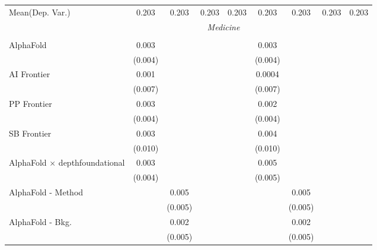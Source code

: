 \begin{tabular}{lcccccccc}
Mean(Dep. Var.) & 0.203 & 0.203 & 0.203 & 0.203 & 0.203 & 0.203 & 0.203 & 0.203 \\
 & \multicolumn{6}{c}{\textit{Medicine}} \\ \\
   AlphaFold                                      & 0.003   &               &       &       & 0.003   &               &       &   \\   
                                                  & (0.004) &               &       &       & (0.004) &               &       &   \\   
   AI Frontier                                    & 0.001   &               &       &       & 0.0004  &               &       &   \\   
                                                  & (0.007) &               &       &       & (0.007) &               &       &   \\   
   PP Frontier                                    & 0.003   &               &       &       & 0.002   &               &       &   \\   
                                                  & (0.004) &               &       &       & (0.004) &               &       &   \\   
   SB Frontier                                    & 0.003   &               &       &       & 0.004   &               &       &   \\   
                                                  & (0.010) &               &       &       & (0.010) &               &       &   \\   
   AlphaFold $\times$ depthfoundational           & 0.003   &               &       &       & 0.005   &               &       &   \\   
                                                  & (0.004) &               &       &       & (0.005) &               &       &   \\   
   AlphaFold - Method                             &         & 0.005         &       &       &         & 0.005         &       &   \\   
                                                  &         & (0.005)       &       &       &         & (0.005)       &       &   \\   
   AlphaFold - Bkg.                               &         & 0.002         &       &       &         & 0.002         &       &   \\   
                                                  &         & (0.005)       &       &       &         & (0.005)       &       &   \\   

\end{tabular}
